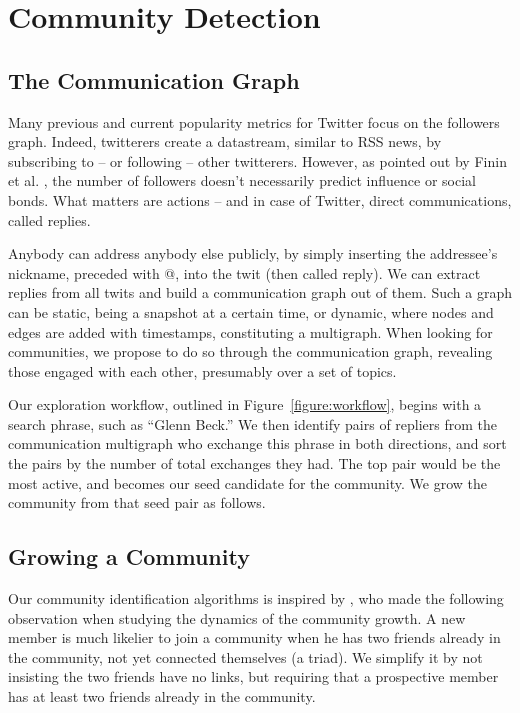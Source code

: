 \section{Community Detection}

\subsection{The Communication Graph}

Many previous and current popularity metrics for Twitter focus on the followers graph.  Indeed, twitterers create a datastream, similar to RSS news, by subscribing to -- or following -- other twitterers.  However, as pointed out by Finin et al. \cite{Finin07}, the number of followers doesn’t necessarily predict influence or social bonds.  What matters are actions -- and in case of Twitter, direct communications, called replies.

Anybody can address anybody else publicly, by simply inserting the addressee’s nickname, preceded with @, into the twit (then called reply).  We can extract replies from all twits and build a communication graph out of them.  Such a graph can be static, being a snapshot at a certain time, or dynamic, where nodes and edges are added with timestamps, constituting a multigraph.  When looking for communities, we propose to do so through the communication graph, revealing those engaged with each other, presumably over a set of topics.

Our exploration workflow, outlined in Figure~\ref{figure:workflow}, begins with a search phrase, such as ``Glenn Beck.''  We then identify pairs of repliers from the communication multigraph who exchange this phrase in both directions, and sort the pairs by the number of total exchanges they had.  The top pair would be the most active, and becomes our seed candidate for the community.  We grow the community from that seed pair as follows.

\subsection{Growing a Community}

Our community identification algorithms is inspired by \cite{Backstrom06}, who made the following observation when studying the dynamics of the community growth.  A new member is much likelier to join a community when he has two friends already in the community, not yet connected themselves (a triad).  We simplify it by not insisting the two friends have no links, but requiring that a prospective member has at least two friends already in the community.

